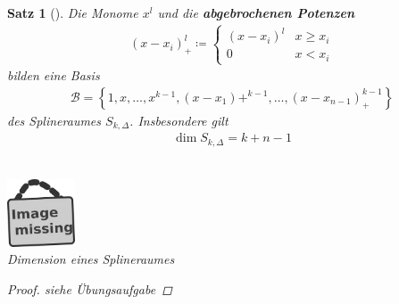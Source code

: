 \documentclass[ngerman,fontsize=11pt, paper=a4, parskip=half, titlepage=true, toc=bib]{scrbook}
\theoremstyle{definition}
\theoremstyle{plain}
\newtheorem{Satz}[Def]{Satz}		%
\newenvironment{Satze}[1][]{ %
  \begin{Satz}[#1]  }
  { \end{Satz}
  	\addtocounter{subsection}{1}}
\newcommand{\imagemissing}[1]{
  \begin{center}~\\
    \centering 
    \includegraphics[width=2cm]{images/image_missing.jpg}\\
    \textit{#1} \\
  \end{center}
}
\begin{document}
\begin{Satze}\label{6.2.2}
Die Monome $x^l$ und die \textbf{abgebrochenen Potenzen}
\begin{gather}
  (x-x_i)_+^l\coloneqq
  \begin{cases}
    (x-x_i)^l & x\geq x_i\\
    0         & x<x_i
  \end{cases}
  \label{VI.2.1}
\end{gather}
bilden eine Basis
\begin{gather*}
  \mathcal{B}=
  \left\{
    1,x,\dots,x^{k-1},(x-x_1)+^{k-1},\dots,(x-x_{n-1})_+^{k-1}
  \right\}
\end{gather*}
des Splineraumes $S_{k,\Delta}$. Insbesondere gilt
\begin{gather}
  \dim S_{k,\Delta}=k+n-1
  \label{VI.2.2}
\end{gather}
\imagemissing{Dimension eines Splineraumes}

\begin{proof}
  siehe Übungsaufgabe
\end{proof}
\end{Satze}





\nocite{*} %

\backmatter		%


\printindex		%

\printbibliography	%
\end{document}

